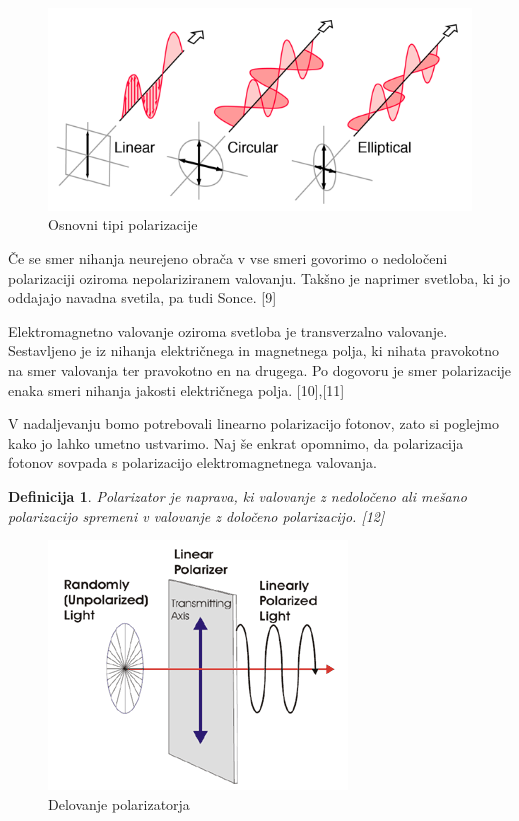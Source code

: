 \documentclass[A4paper, 11pt]{article}
\newtheorem{definicija}{Definicija}
\begin{document}
\begin{figure}[h]
\centering
\caption{Osnovni tipi polarizacije}
\includegraphics[scale=2]{polcls}
\end{figure}

\pagebreak

Če se smer nihanja neurejeno obrača v vse smeri govorimo o nedoločeni polarizaciji oziroma nepolariziranem valovanju. Takšno je naprimer svetloba, ki jo oddajajo navadna svetila, pa tudi Sonce. [9]

Elektromagnetno valovanje oziroma svetloba je transverzalno valovanje. Sestavljeno je iz nihanja električnega in magnetnega polja, ki nihata pravokotno na smer valovanja ter pravokotno en na drugega. Po dogovoru je smer polarizacije enaka smeri nihanja jakosti električnega polja. [10],[11]

V nadaljevanju bomo potrebovali linearno polarizacijo fotonov, zato si poglejmo kako jo lahko umetno ustvarimo. Naj še enkrat opomnimo, da polarizacija fotonov sovpada s polarizacijo elektromagnetnega valovanja. 

\begin{definicija}
Polarizator je naprava, ki valovanje z nedoločeno ali mešano polarizacijo spremeni v valovanje z določeno polarizacijo. [12]
\end{definicija}

\begin{figure}[h]
\centering
\caption{Delovanje polarizatorja}
\includegraphics[scale=0.7]{linear-figure-1}
\end{figure}
\end{document}
